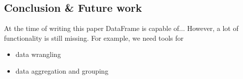 \documentclass{article}
\begin{document}
\begin{multicols}{2}
%

\section{Conclusion \& Future work}
\label{sec:conclusion}
At the time of writing this paper DataFrame is capable of...
However, a lot of functionality is still missing. For example, we need tools for
\begin{itemize}
  \item data wrangling
  \item data aggregation and grouping
\end{itemize}





%


% 
% 

% 




%
\end{multicols}
\end{document}
